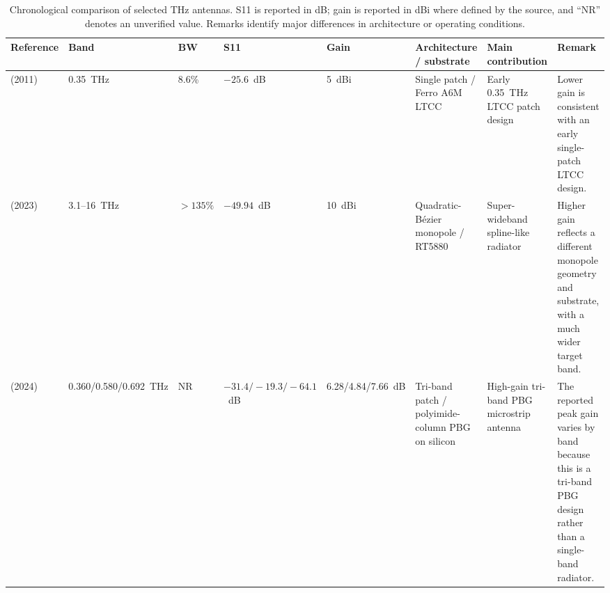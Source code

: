 \documentclass[draft]{agujournal2019}
\begin{document}
\begin{table}[t]
\centering
\scriptsize
\caption{Chronological comparison of selected THz antennas. S11 is reported in dB; gain is reported in dBi where defined by the source, and ``NR'' denotes an unverified value. Remarks identify major differences in architecture or operating conditions.}
\label{tab3}
\renewcommand{\arraystretch}{1.15}
\setlength{\tabcolsep}{3pt}
\begin{tabularx}{\linewidth}{@{}M{2.2cm}C{1.35cm}C{1.1cm}C{1.2cm}C{1.1cm}M{2.0cm}M{2.2cm}M{3.0cm}@{}}
\toprule
\textbf{Reference} & \textbf{Band} & \textbf{BW} & \textbf{S11} & \textbf{Gain} & \textbf{Architecture / substrate} & \textbf{Main contribution} & \textbf{Remark} \\
\midrule
\cite{elnawawy_ltcc_2012} (2011) & 0.35~THz & 8.6\% & $-25.6$~dB & 5~dBi & Single patch / Ferro A6M LTCC & Early 0.35~THz LTCC patch design & Lower gain is consistent with an early single-patch LTCC design. \\
\cite{marouf_bezier_2023} (2023) & 3.1--16~THz & $>135\%$ & $-49.94$~dB & 10~dBi & Quadratic-Bézier monopole / RT5880 & Super-wideband spline-like radiator & Higher gain reflects a different monopole geometry and substrate, with a much wider target band. \\
\cite{li_triband_2024} (2024) & 0.360/0.580/0.692~THz & NR & $-31.4/-19.3/-64.1$~dB & 6.28/4.84/7.66~dB & Tri-band patch / polyimide-column PBG on silicon & High-gain tri-band PBG microstrip antenna & The reported peak gain varies by band because this is a tri-band PBG design rather than a single-band radiator. \\


\end{tabularx}
\end{table}
\end{document}
